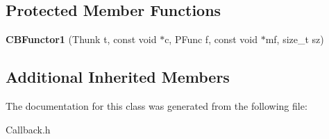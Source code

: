 \subsection*{Protected Member Functions}
\begin{DoxyCompactItemize}
\item 
{\bfseries C\+B\+Functor1} (Thunk t, const void $\ast$c, P\+Func f, const void $\ast$mf, size\+\_\+t sz)\label{classCBFunctor1_ab244cc7ecd861d72918ae3e02694b1c1}

\end{DoxyCompactItemize}
\subsection*{Additional Inherited Members}


The documentation for this class was generated from the following file\+:\begin{DoxyCompactItemize}
\item 
Callback.\+h\end{DoxyCompactItemize}
